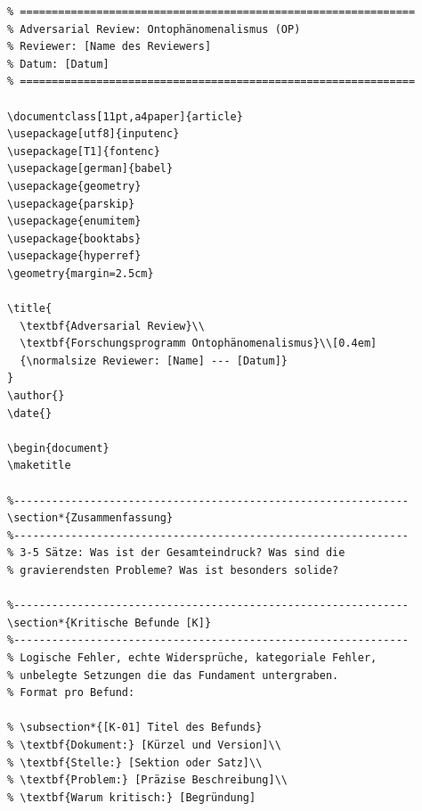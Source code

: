 \documentclass[11pt,a4paper]{article}
\theoremstyle{definition}
\begin{document}
\begin{verbatim}
% ==============================================================
% Adversarial Review: Ontophänomenalismus (OP)
% Reviewer: [Name des Reviewers]
% Datum: [Datum]
% ==============================================================

\documentclass[11pt,a4paper]{article}
\usepackage[utf8]{inputenc}
\usepackage[T1]{fontenc}
\usepackage[german]{babel}
\usepackage{geometry}
\usepackage{parskip}
\usepackage{enumitem}
\usepackage{booktabs}
\usepackage{hyperref}
\geometry{margin=2.5cm}

\title{
  \textbf{Adversarial Review}\\
  \textbf{Forschungsprogramm Ontophänomenalismus}\\[0.4em]
  {\normalsize Reviewer: [Name] --- [Datum]}
}
\author{}
\date{}

\begin{document}
\maketitle

%--------------------------------------------------------------
\section*{Zusammenfassung}
%--------------------------------------------------------------
% 3-5 Sätze: Was ist der Gesamteindruck? Was sind die
% gravierendsten Probleme? Was ist besonders solide?

%--------------------------------------------------------------
\section*{Kritische Befunde [K]}
%--------------------------------------------------------------
% Logische Fehler, echte Widersprüche, kategoriale Fehler,
% unbelegte Setzungen die das Fundament untergraben.
% Format pro Befund:

% \subsection*{[K-01] Titel des Befunds}
% \textbf{Dokument:} [Kürzel und Version]\\
% \textbf{Stelle:} [Sektion oder Satz]\\
% \textbf{Problem:} [Präzise Beschreibung]\\
% \textbf{Warum kritisch:} [Begründung]


\end{verbatim}
\end{document}
